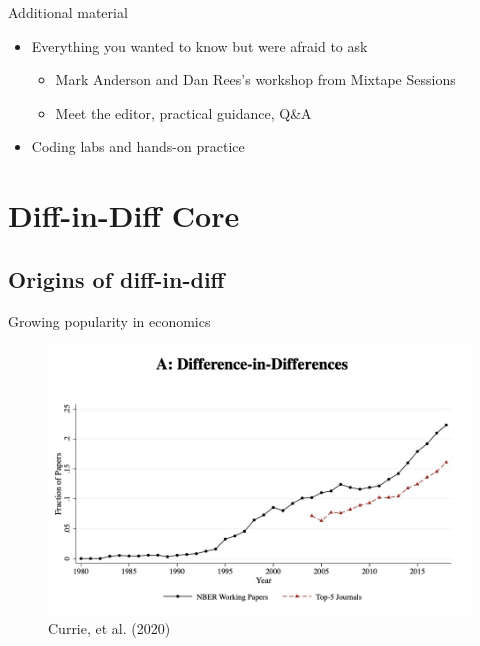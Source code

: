 \documentclass{beamer}
\begin{document}
\begin{frame}{Additional material}

\begin{itemize}
\item Everything you wanted to know but were afraid to ask	
	\begin{itemize}
	\item Mark Anderson and Dan Rees's workshop from Mixtape Sessions
	\item Meet the editor, practical guidance, Q\&A
	\end{itemize}
\item Coding labs and hands-on practice
\end{itemize}

\end{frame}


\section{Diff-in-Diff Core}


\subsection{Origins of diff-in-diff}


\begin{frame}{Growing popularity in economics}

	\begin{figure}
	\caption{Currie, et al. (2020)}
	\includegraphics[scale=0.25]{./lecture_includes/currie_did.png}
	\end{figure}

\bigskip

\footnotesize


\end{frame}
\end{document}
